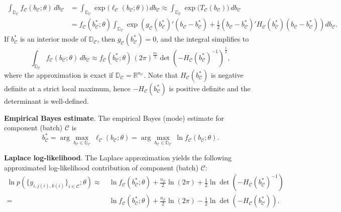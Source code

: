 \documentclass[12pt]{article}
\begin{document}
\begin{equation}
\label{eq:laplace_step_component}
\begin{split}
\int_{\mathbb{D}_{\mathcal{C}}} f_{\mathcal{C}}(b_{\mathcal{C}};\theta)\, db_{\mathcal{C}}
&=
\int_{\mathbb{D}_{\mathcal{C}}} \exp\!\big(\ell_{\mathcal{C}}(b_{\mathcal{C}};\theta)\big)\, db_{\mathcal{C}}
\approx
\int_{\mathbb{D}_{\mathcal{C}}} \exp\!\big(T_{\mathcal{C}}(b_{\mathcal{C}})\big)\, db_{\mathcal{C}}\\
&=
f_{\mathcal{C}}(b_{\mathcal{C}}^*;\theta)
\int_{\mathbb{D}_{\mathcal{C}}}
\exp\!\left(
g_{\mathcal{C}}(b_{\mathcal{C}}^*)'(b_{\mathcal{C}}-b_{\mathcal{C}}^*)
+\tfrac{1}{2}(b_{\mathcal{C}}-b_{\mathcal{C}}^*)'H_{\mathcal{C}}(b_{\mathcal{C}}^*)(b_{\mathcal{C}}-b_{\mathcal{C}}^*)
\right) db_{\mathcal{C}}.
\end{split}
\end{equation}
If \(b_{\mathcal{C}}^*\) is an interior mode of \(\mathbb{D}_{\mathcal{C}}\), then \(g_{\mathcal{C}}(b_{\mathcal{C}}^*)=0\), and the integral simplifies to
\begin{equation}
\label{eq:laplace_component}
\int_{\mathbb{D}_{\mathcal{C}}} f_{\mathcal{C}}(b_{\mathcal{C}};\theta)\, db_{\mathcal{C}}
\approx
f_{\mathcal{C}}(b_{\mathcal{C}}^*;\theta)\,(2\pi)^{\frac{n_{\mathcal{C}}}{2}}
\det\!\left(-H_{\mathcal{C}}(b_{\mathcal{C}}^*)^{-1}\right)^{\frac{1}{2}},
\end{equation}
where the approximation is exact if \(\mathbb{D}_{\mathcal{C}}=\mathbb{R}^{n_{\mathcal{C}}}\). Note that \(H_{\mathcal{C}}(b_{\mathcal{C}}^*)\) is negative definite at a strict local maximum, hence \(-H_{\mathcal{C}}(b_{\mathcal{C}}^*)\) is positive definite and the determinant is well-defined.

\textbf{Empirical Bayes estimate}. The empirical Bayes (mode) estimate for component (batch) \(\mathcal{C}\) is
\[
b_{\mathcal{C}}^*
=
\arg\max_{b_{\mathcal{C}}\in\mathbb{D}_{\mathcal{C}}}\ \ell_{\mathcal{C}}(b_{\mathcal{C}};\theta)
=
\arg\max_{b_{\mathcal{C}}\in\mathbb{D}_{\mathcal{C}}}\ \ln f_{\mathcal{C}}(b_{\mathcal{C}};\theta).
\]

\textbf{Laplace log-likelihood}. The Laplace approximation yields the following approximated log-likelihood contribution of component (batch) \(\mathcal{C}\):
\begin{equation}
\label{eq:laplace_loglik_component}
\begin{split}
\ln p\!\left(\{y_{i,j(i),k(i)}\}_{i\in\mathcal{C}};\theta\right)
\approx\ 
&\ln f_{\mathcal{C}}(b_{\mathcal{C}}^*;\theta)
+\frac{n_{\mathcal{C}}}{2}\ln(2\pi)
+\frac{1}{2}\ln\det\!\left(-H_{\mathcal{C}}(b_{\mathcal{C}}^*)^{-1}\right)\\
=\ 
&\ln f_{\mathcal{C}}(b_{\mathcal{C}}^*;\theta)
+\frac{n_{\mathcal{C}}}{2}\ln(2\pi)
-\frac{1}{2}\ln\det\!\left(-H_{\mathcal{C}}(b_{\mathcal{C}}^*)\right).
\end{split}
\end{equation}
\end{document}
